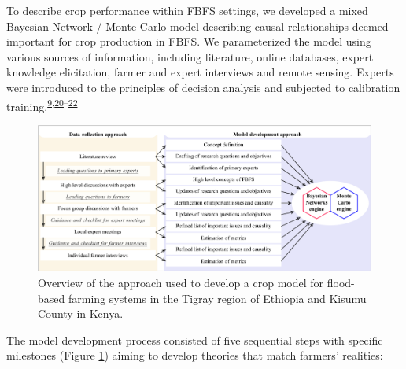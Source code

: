 \documentclass[]{elsarticle} %
\begin{document}
To describe crop performance within FBFS settings, we developed a mixed Bayesian Network / Monte Carlo model describing causal relationships deemed important for crop production in FBFS. We parameterized the model using various sources of information, including literature, online databases, expert knowledge elicitation, farmer and expert interviews and remote sensing. Experts were introduced to the principles of decision analysis and subjected to calibration training.\textsuperscript{\protect\hyperlink{ref-Luedeling_et_al_2015}{9},\protect\hyperlink{ref-Hubbard_2014}{20}--\protect\hyperlink{ref-Whitney_Shepherd_et_al_2018}{22}}

\begin{figure}[!h]

{\centering \includegraphics[width=1\linewidth,]{Modelling_FBFS_files/figure-latex/fig2-plot-1} 

}

\caption{Overview of the approach used to develop a crop model for flood-based farming systems in the Tigray region of Ethiopia and Kisumu County in Kenya.}\label{fig:fig2}
\end{figure}

The model development process consisted of five sequential steps with specific milestones (Figure \ref{fig:fig2}) aiming to develop theories that match farmers' realities:
\end{document}
